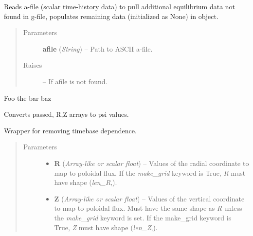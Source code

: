 \documentclass[letterpaper,10pt,english]{sphinxmanual}
\begin{document}
\begin{fulllineitems}

\begin{fulllineitems}
\label{eqtools:eqtools.eqdskreader.EqdskReader.readAFile}
Reads a-file (scalar time-history data) to pull additional
equilibrium data not found in g-file, populates remaining data
(initialized as None) in object.
\begin{quote}\begin{description}
\item[{Parameters}] \leavevmode
\textbf{afile} (\emph{String}) --
Path to ASCII a-file.

\item[{Raises}] \leavevmode
{} -- 
If afile is not found.

\end{description}\end{quote}

\end{fulllineitems}


\begin{fulllineitems}
\label{eqtools:eqtools.eqdskreader.EqdskReader.aaaaa}
Foo the bar baz

\end{fulllineitems}


\begin{fulllineitems}
\label{eqtools:eqtools.eqdskreader.EqdskReader.rz2psi}
Converts passed, R,Z arrays to psi values.

Wrapper for  removing timebase dependence.
\begin{quote}\begin{description}
\item[{Parameters}] \leavevmode\begin{itemize}
\item {} 
\textbf{R} (\emph{Array-like or scalar float}) --
Values of the radial coordinate to
map to poloidal flux. If the \emph{make\_grid} keyword is True, \emph{R}
must have shape (\emph{len\_R},).

\item {} 
\textbf{Z} (\emph{Array-like or scalar float}) --
Values of the vertical coordinate to
map to poloidal flux. Must have the same shape as \emph{R} unless the
\emph{make\_grid} keyword is set. If the make\_grid keyword is True,
\emph{Z} must have shape (\emph{len\_Z},).


\end{itemize}
\end{description}
\end{quote}
\end{fulllineitems}
\end{fulllineitems}
\end{document}
